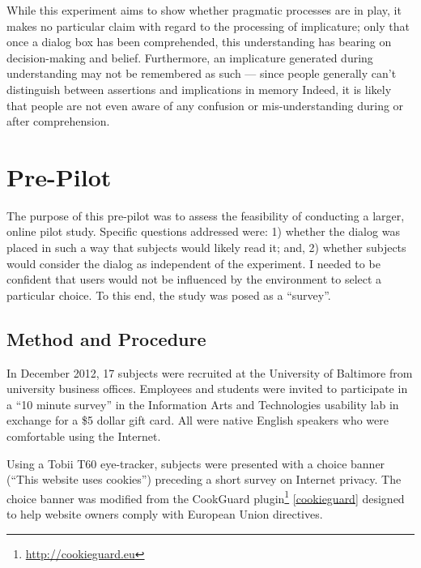 While this experiment aims to show whether pragmatic processes are in play, it makes no particular claim with regard to the processing of implicature; only that once a dialog box has been comprehended, this understanding has bearing on decision-making and belief. Furthermore, an implicature generated during understanding may not be remembered as such --- since people generally can't distinguish between assertions and implications in memory  \citep{Brewer:1977tl}  Indeed, it is likely that people are not even aware of any confusion or mis-understanding during or after comprehension.

\section{Pre-Pilot}
\label{pre-pilot}

The purpose of this pre-pilot was to assess the feasibility of conducting a larger, online pilot study. Specific questions addressed were: 1) whether the dialog was placed in such a way that subjects would likely read it; and, 2) whether subjects would consider the dialog as independent of the experiment. I needed to be confident that users would not be influenced by the environment to select a particular choice. To this end, the study was posed as a ``survey''.

\subsection{Method and Procedure}
\label{methodandprocedure}

In December 2012, 17 subjects were recruited at the University of Baltimore from university business offices. Employees and students were invited to participate in a ``10 minute survey'' in the Information Arts and Technologies usability lab in exchange for a \$5 dollar gift card. All were native English speakers who were comfortable using the Internet.

Using a Tobii T60 eye-tracker, subjects were presented with a choice banner (``This website uses cookies'') preceding a short survey on Internet privacy. The choice banner was modified from the CookGuard plugin\footnote{ \url{http://cookieguard.eu} }  \autoref{cookieguard}  designed to help website owners comply with European Union directives. 


